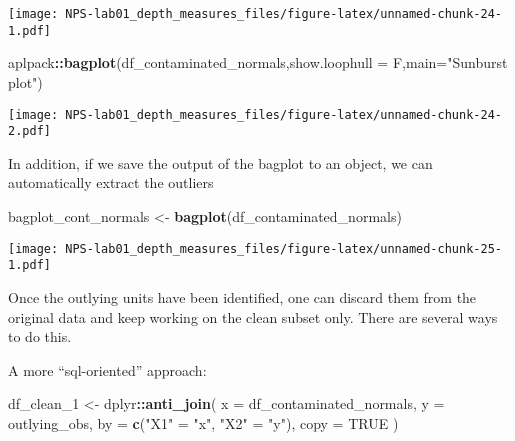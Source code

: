 \documentclass[
]{article}
\newenvironment{Shaded}{\begin{snugshade}}{\end{snugshade}}
\newcommand{\AttributeTok}[1]{\textcolor[rgb]{0.13,0.29,0.53}{#1}}
\newcommand{\ConstantTok}[1]{\textcolor[rgb]{0.56,0.35,0.01}{#1}}
\newcommand{\FunctionTok}[1]{\textcolor[rgb]{0.13,0.29,0.53}{\textbf{#1}}}
\newcommand{\NormalTok}[1]{#1}
\newcommand{\OtherTok}[1]{\textcolor[rgb]{0.56,0.35,0.01}{#1}}
\newcommand{\SpecialCharTok}[1]{\textcolor[rgb]{0.81,0.36,0.00}{\textbf{#1}}}
\newcommand{\StringTok}[1]{\textcolor[rgb]{0.31,0.60,0.02}{#1}}
\begin{document}
\texttt{[image: NPS-lab01\_depth\_measures\_files/figure-latex/unnamed-chunk-24-1.pdf]}

\begin{Shaded}
\begin{Highlighting}[]
\NormalTok{aplpack}\SpecialCharTok{::}\FunctionTok{bagplot}\NormalTok{(df\_contaminated\_normals,}\AttributeTok{show.loophull =}\NormalTok{ F,}\AttributeTok{main=}\StringTok{"Sunburst plot"}\NormalTok{)}
\end{Highlighting}
\end{Shaded}

\texttt{[image: NPS-lab01\_depth\_measures\_files/figure-latex/unnamed-chunk-24-2.pdf]}

In addition, if we save the output of the bagplot to an object, we can
automatically extract the outliers

\begin{Shaded}
\begin{Highlighting}[]
\NormalTok{bagplot\_cont\_normals }\OtherTok{\textless{}{-}} \FunctionTok{bagplot}\NormalTok{(df\_contaminated\_normals)}
\end{Highlighting}
\end{Shaded}

\texttt{[image: NPS-lab01\_depth\_measures\_files/figure-latex/unnamed-chunk-25-1.pdf]}

\begin{Shaded}
\end{Shaded}

Once the outlying units have been identified, one can discard them from
the original data and keep working on the clean subset only. There are
several ways to do this.

A more ``sql-oriented'' approach:

\begin{Shaded}
\begin{Highlighting}[]
\NormalTok{df\_clean\_1 }\OtherTok{\textless{}{-}}
\NormalTok{  dplyr}\SpecialCharTok{::}\FunctionTok{anti\_join}\NormalTok{(}
    \AttributeTok{x =}\NormalTok{ df\_contaminated\_normals,}
    \AttributeTok{y =}\NormalTok{ outlying\_obs,}
    \AttributeTok{by =} \FunctionTok{c}\NormalTok{(}\StringTok{"X1"} \OtherTok{=} \StringTok{"x"}\NormalTok{, }\StringTok{"X2"} \OtherTok{=} \StringTok{"y"}\NormalTok{),}
    \AttributeTok{copy =} \ConstantTok{TRUE}
\NormalTok{  )}
\end{Highlighting}
\end{Shaded}
\end{document}
